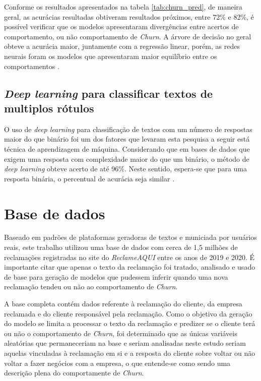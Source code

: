 \documentclass[12pt]{article}
\begin{document}
Conforme os resultados apresentados na tabela \ref{tab:churn_pred}, de maneira geral, as acurácias resultadas obtiveram resultados próximos, entre 72\% e 82\%, é possível verificar que os modelos apresentaram divergências entre acertos de comportamento, ou não comportamento de \emph{Churn}. A árvore de decisão no geral obteve a acurácia maior, juntamente com a regressão linear, porém, as redes neurais foram os modelos que apresentaram maior equilíbrio entre os comportamentos \cite{hadden:06}.

\subsection{\textit{Deep learning} para classificar textos de multiplos rótulos}

O uso de \emph{deep learning} para classificação de textos com um número de respostas maior do que binário foi um dos fatores que levaram esta pesquisa a seguir está técnica de aprendizagem de máquina. Considerando que em bases de dados que exigem uma resposta com complexidade maior do que um binário, o método de \emph{deep learning} obteve acerto de até 96\%. Neste sentido, espera-se que para uma resposta binária, o percentual de acurácia seja similar \cite{liu:17}.

\section{Base de dados}\label{sec:database}

Baseado em padrões de plataformas geradoras de textos e municiada por usuários reais, este trabalho utilizou uma base de dados com cerca de 1,5 milhões de reclamações registradas no site do \emph{ReclameAQUI} entre os anos de 2019 e 2020. É importante citar que apenas o texto da reclamação foi tratado, analisado e usado de base para geração de modelos que pudessem inferir quando uma nova reclamação tendeu ou não ao comportamento de \emph{Churn}.

A base completa contém dados referente à reclamação do cliente, da empresa reclamada e do cliente responsável pela reclamação. Como o objetivo da geração do modelo se limita a processar o texto da reclamação e predizer se o cliente terá ou não o comportamento de \emph{Churn}, foi determinado que as únicas variáveis aleatórias que permaneceriam na base e seriam analisadas neste estudo seriam aquelas vinculadas à reclamação em si e a resposta do cliente sobre voltar ou não voltar a fazer negócios com a empresa, o que entende-se como sendo uma descrição plena do comportamente de \emph{Churn}.
\end{document}
